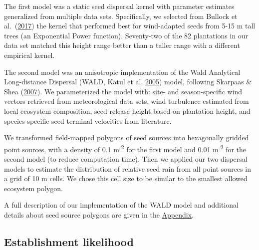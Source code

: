\documentclass[
]{article}
\begin{document}
The first model was a static seed dispersal kernel with parameter estimates generalized from multiple data sets.
Specifically, we selected from Bullock et al.~(\protect\hyperlink{ref-bullockSynthesisEmpiricalPlant2017}{2017}) the kernel that performed best for wind-adapted seeds from 5-15 m tall trees (an Exponential Power function).
Seventy-two of the 82 plantations in our data set matched this height range better than a taller range with a different empirical kernel.

The second model was an anisotropic implementation of the Wald Analytical Long-distance Dispersal (WALD, Katul et al. \protect\hyperlink{ref-katulMechanisticAnalyticalModels2005}{2005}) model, following Skarpaas \& Shea (\protect\hyperlink{ref-skarpaasDispersalPatternsDispersal2007}{2007}).
We parameterized the model with: site- and season-specific wind vectors retrieved from meteorological data sets, wind turbulence estimated from local ecosystem composition, seed release height based on plantation height, and species-specific seed terminal velocities from literature.

We transformed field-mapped polygons of seed sources into hexagonally gridded point sources, with a density of 0.1 m\textsuperscript{-2} for the first model and 0.01 m\textsuperscript{-2} for the second model (to reduce computation time).
Then we applied our two dispersal models to estimate the distribution of relative seed rain from all point sources in a grid of 10 m cells.
We chose this cell size to be similar to the smallest allowed ecosystem polygon.

A full description of our implementation of the WALD model and additional details about seed source polygons are given in the \protect\hyperlink{appendix}{Appendix}.

\hypertarget{establishment-likelihood}{%
\subsection{Establishment likelihood}\label{establishment-likelihood}}
\end{document}
